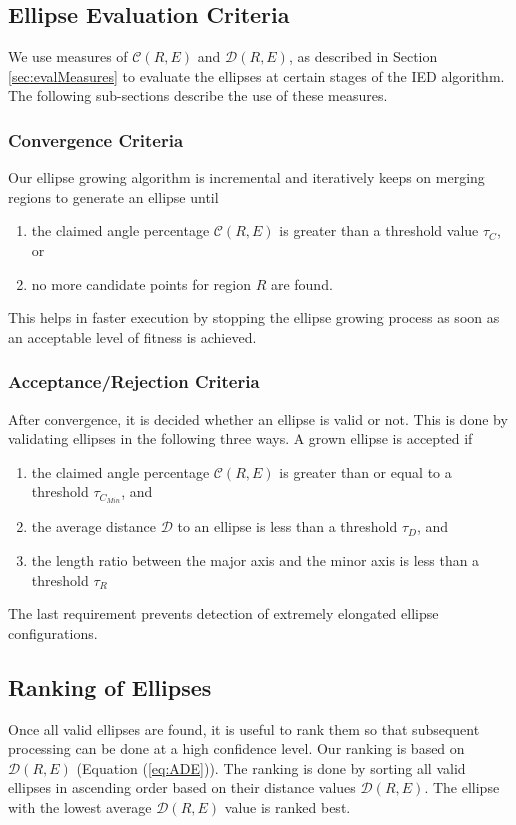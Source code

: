 \documentclass[preprint]{iucr}              %
\begin{document}
\subsection{Ellipse Evaluation Criteria}  \label{sec:evalCriteria}
We use measures of $\mathcal{C}(R,E)$ and $\mathcal{D}(R,E)$, as described in Section \ref{sec:evalMeasures} to evaluate the ellipses at certain stages of the IED algorithm. The following sub-sections describe the use of these measures.
\subsubsection{Convergence Criteria}
Our ellipse growing algorithm is incremental and iteratively keeps on merging regions to generate an ellipse until 
\begin{enumerate}
    \item the claimed angle percentage $\mathcal{C}(R,E)$ is greater than a threshold value ${\tau}_C$, or
    \item no more candidate points for region $R$ are found.
\end{enumerate}

This helps in faster execution by stopping the ellipse growing process as soon as an acceptable level of fitness is achieved.

\subsubsection{Acceptance/Rejection Criteria}
After convergence, it is decided whether an ellipse is valid or not. This is done by validating ellipses in the following three ways. A grown ellipse is accepted if
\begin{enumerate}
    \item the claimed angle percentage $\mathcal{C}(R,E)$ is greater than or equal to a threshold ${\tau}_{C_{Min}}$, and
    \item the average distance $\mathcal{D}$ to an ellipse is less than a threshold ${\tau}_D$, and
    \item the length ratio between the major axis and the minor axis is less than a threshold ${\tau}_R$
\end{enumerate}

The last requirement prevents detection of extremely elongated ellipse configurations.

\subsection{Ranking of Ellipses}
Once all valid ellipses are found, it is useful to rank them so that subsequent processing can be done at a high confidence level. Our ranking is based on $\mathcal{D}(R,E)$ (Equation (\ref{eq:ADE})). The ranking is done by sorting all valid ellipses in ascending order based on their distance values $\mathcal{D}(R,E)$. The ellipse with the lowest average $\mathcal{D}(R,E)$ value is ranked best. 
\end{document}
